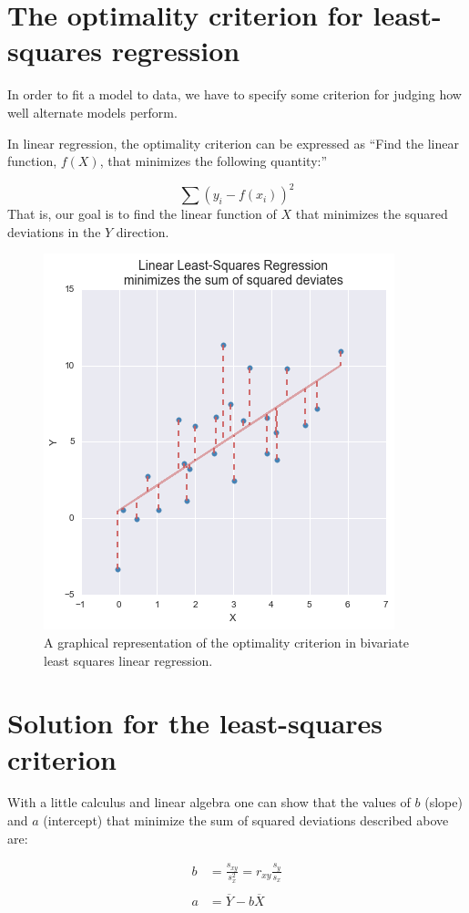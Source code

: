 \documentclass[]{book}
\theoremstyle{definition}
\theoremstyle{definition}
\theoremstyle{definition}
\theoremstyle{remark}
\begin{document}
\hypertarget{the-optimality-criterion-for-least-squares-regression}{%
\section{The optimality criterion for least-squares
regression}\label{the-optimality-criterion-for-least-squares-regression}}

In order to fit a model to data, we have to specify some criterion for
judging how well alternate models perform.

In linear regression, the optimality criterion can be expressed as
``Find the linear function, \(f(X)\), that minimizes the following
quantity:''

\[
\sum (y_i - f(x_i))^2
\] That is, our goal is to find the linear function of \(X\) that
minimizes the squared deviations in the \(Y\) direction.

\begin{figure}

{\centering \includegraphics[width=0.4\linewidth]{./figures/fig-regression-minimization} 

}

\caption{A graphical representation of the optimality criterion in bivariate least squares linear regression.}\label{fig:unnamed-chunk-491}
\end{figure}

\hypertarget{solution-for-the-least-squares-criterion}{%
\section{Solution for the least-squares
criterion}\label{solution-for-the-least-squares-criterion}}

With a little calculus and linear algebra one can show that the values
of \(b\) (slope) and \(a\) (intercept) that minimize the sum of squared
deviations described above are:

\begin{align}
b &= \frac{s_{xy}}{s^2_x} = r_{xy}\frac{s_y}{s_x}\\
\\
a &= \overline{Y} - b\overline{X}
\end{align}
\end{document}
